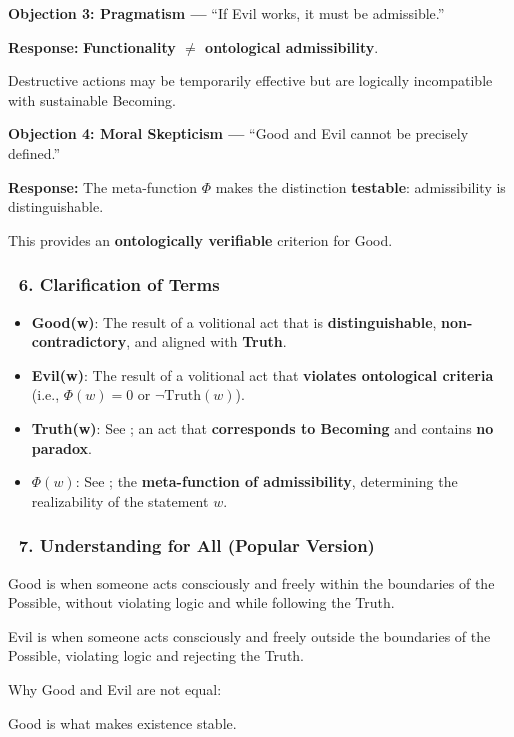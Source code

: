 \documentclass[12pt]{article}
\begin{document}
\textbf{Objection 3: Pragmatism —} ``If Evil works, it must be admissible.''

\textbf{Response:} \textbf{Functionality $\neq$ ontological admissibility}.

Destructive actions may be temporarily effective but are logically incompatible with sustainable Becoming.

\textbf{Objection 4: Moral Skepticism —} ``Good and Evil cannot be precisely defined.''

\textbf{Response:} The meta-function $\Phi$ makes the distinction \textbf{testable}: admissibility is distinguishable.

This provides an \textbf{ontologically verifiable} criterion for Good.

\subsubsection*{🔹 6. Clarification of Terms}

\begin{itemize}
\item \textbf{Good(w)}: The result of a volitional act that is \textbf{distinguishable}, \textbf{non-contradictory}, and aligned with \textbf{Truth}.
\item \textbf{Evil(w)}: The result of a volitional act that \textbf{violates ontological criteria} (i.e., $\Phi(w)=0$ or $\neg \text{Truth}(w)$).
\item \textbf{Truth(w)}: See \text{[11.2]}; an act that \textbf{corresponds to Becoming} and contains \textbf{no paradox}.
\item \textbf{$\Phi(w)$}: See \text{[11.1.1]}; the \textbf{meta-function of admissibility}, determining the realizability of the statement $w$.
\end{itemize}

\subsubsection*{🔹 7. Understanding for All (Popular Version)}

Good is when someone acts consciously and freely within the boundaries of the Possible, without violating logic and while following the Truth.

Evil is when someone acts consciously and freely outside the boundaries of the Possible, violating logic and rejecting the Truth.

Why Good and Evil are not equal:

Good is what makes existence stable.
\end{document}
